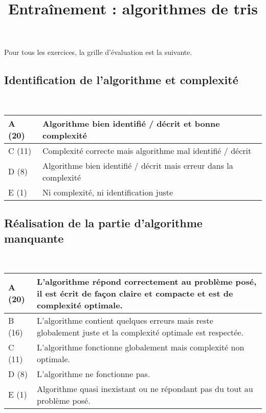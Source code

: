 \documentclass{../cours}
\title{Entraînement : algorithmes de tris}
\begin{document}
\maketitle

Pour tous les exercices, la grille d'évaluation est la suivante.

\subsection*{Identification de l'algorithme et complexité}~

\begin{tabular}{|l|p{12cm}|}
\hline
A (20) & \small{Algorithme bien identifié / décrit et bonne complexité} \\ \hline
C (11) & \small{Complexité correcte mais algorithme mal identifié / décrit} \\ \hline
D (8) & \small{Algorithme bien identifié / décrit mais erreur dans la complexité} \\ \hline
E (1) & \small{Ni complexité, ni identification juste} \\ \hline
\end{tabular}

\subsection*{Réalisation de la partie d'algorithme manquante}~

\begin{tabular}{|l|p{12cm}|}
\hline
A (20) & \small{L'algorithme répond correctement au problème posé, il est écrit de façon claire et compacte et est de complexité optimale.} \\ \hline
B (16) & \small{L'algorithme contient quelques erreurs mais reste globalement juste et la complexité optimale est respectée.} \\ \hline
C (11) & \small{L'algorithme fonctionne globalement mais complexité non optimale.} \\ \hline
D (8) & \small{L'algorithme ne fonctionne pas.} \\ \hline
E (1) & \small{Algorithme quasi inexistant ou ne répondant pas du tout au problème posé.} \\ \hline
\end{tabular}





\end{document}
